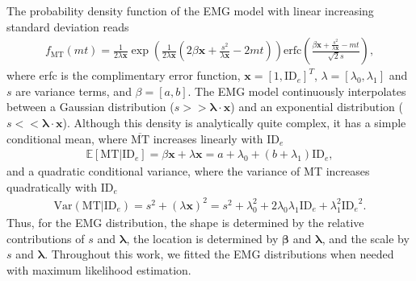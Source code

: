 \documentclass[acmlarge, manuscript,review]{acmart}
\newcommand{\mmt}{\ensuremath{\overline{\mt}}\xspace}
\newcommand{\mt}{\ensuremath{{\text{MT}}}\xspace}
\newcommand{\ide}{\ensuremath{{\text{ID}_e}}\xspace}
\begin{document}
The probability density function of the EMG model with linear increasing standard deviation reads
\begin{align}
  f_{\mt}(mt) = \frac{1}{2\lambda\mathbf{x}} \exp\left(\frac{1}{2\lambda\mathbf{x}}(2\beta\mathbf{x} + \frac{s^2}{\lambda\mathbf{x}} - 2mt)\right) \mathrm{erfc}\left(\frac{\beta\mathbf{x} + \frac{s^2}{\lambda\mathbf{x}} - mt}{\sqrt{2} s}\right),
\end{align}
where erfc is the complimentary error function, $\mathbf{x} = \left[1, \ide \right]^T$, $\lambda = \left[ \lambda_0, \lambda_1 \right]$ and $s$ are variance terms, and $\beta = \left[ a, b\right]$.
The EMG model continuously interpolates between a Gaussian distribution ($s >> \mathbf{\lambda} \cdot \mathbf{x} $) and an exponential distribution ($s <<  \mathbf{\lambda} \cdot \mathbf{x}$).
Although this density is analytically quite complex, it has a simple conditional mean, where \mmt increases linearly with \ide
\begin{align}
  \mathbb{E}[\mt|\ide] = \beta \mathbf{x} + \lambda \mathbf{x} = a + \lambda_0 + (b + \lambda_1) \ide, \label{eq:emg_mean}
\end{align}
and a quadratic conditional variance, where the variance of MT increases quadratically with \ide
\begin{align}
  \text{Var}(\mt|\ide) = s^2 + (\lambda \mathbf{x})^2 = s^2 + \lambda_0^2 + 2\lambda_0\lambda_1\ide + \lambda_1^2\ide^2. \label{eq:emg_conditional_variance}
\end{align}
Thus, for the EMG distribution, the shape is determined by the relative contributions of $s$ and $ \mathbf{\lambda}$, the location is determined by $\mathbf{\beta}$ and $\mathbf{\lambda}$, and the scale by $s$ and $ \mathbf{\lambda}$. Throughout this work, we fitted the EMG distributions when needed with maximum likelihood estimation.

\end{document}
